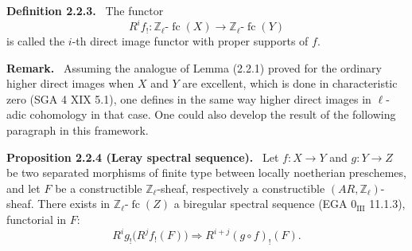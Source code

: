 \documentclass[11pt]{article}
\newenvironment{statement}[1]{\par\medskip\noindent\textbf{#1.}\ }{\par\medskip}
\providecommand{\fc}{\operatorname{fc}}
\begin{document}
\begin{statement}{Definition 2.2.3}
The functor
\[
R^if_!:\mathbb Z_\ell\text{-}\fc(X)\longrightarrow \mathbb Z_\ell\text{-}\fc(Y)
\]
is called the \(i\)-th direct image functor with proper supports of \(f\).
\end{statement}

\begin{statement}{Remark}
Assuming the analogue of Lemma (2.2.1) proved for the ordinary higher direct images when \(X\) and \(Y\) are excellent, which is done in characteristic zero (SGA 4 XIX 5.1), one defines in the same way higher direct images in \(\ell\)-adic cohomology in that case. One could also develop the result of the following paragraph in this framework.
\end{statement}

\begin{statement}{Proposition 2.2.4 (Leray spectral sequence)}
Let \(f:X\to Y\) and \(g:Y\to Z\) be two separated morphisms of finite type between locally noetherian preschemes, and let \(F\) be a constructible \(\mathbb Z_\ell\)-sheaf, respectively a constructible \((AR,\mathbb Z_\ell)\)-sheaf. There exists in \(\mathbb Z_\ell\text{-}\fc(Z)\) a biregular spectral sequence (EGA \(0_{\mathrm{III}}\) 11.1.3), functorial in \(F\):
\[
R^i g_!\bigl(R^j f_!(F)\bigr)\Longrightarrow R^{i+j}(g\circ f)_!(F).
\]
\end{statement}
\end{document}
